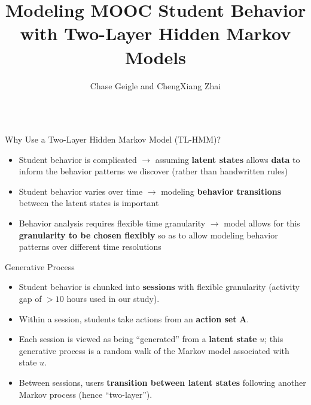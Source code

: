 \documentclass[final,t]{beamer}
\title{Modeling MOOC Student Behavior with Two-Layer Hidden Markov Models}
\author{Chase Geigle and ChengXiang Zhai}
\institute[University of Illinois]{University of Illinois at
Urbana-Champaign, Department of Computer Science}
\date{}
\newcommand{\msp}[0]{\\[0.5\baselineskip]}
\newcommand{\vsp}[0]{\vspace{0.21in}}
\begin{document}
\begin{frame}[fragile]
  \begin{columns}[t]
    \begin{column}{0.6\textwidth}
      \begin{block}{Why Use a Two-Layer Hidden Markov Model (TL-HMM)?}
        \begin{itemize}
          \item Student behavior is complicated $\rightarrow$ assuming
            \textbf{latent states} allows \textbf{data} to inform the
            behavior patterns we discover (rather than handwritten rules)
            \msp{}

          \item Student behavior varies over time $\rightarrow$ modeling
            \textbf{behavior transitions} between the latent states is
            important
            \msp{}

          \item Behavior analysis requires flexible time granularity
            $\rightarrow$ model allows for this \textbf{granularity to be
            chosen flexibly} so as to allow modeling behavior patterns over
            different time resolutions
        \end{itemize}
      \end{block}
      \vsp{}
      \begin{block}{Generative Process}
        \begin{itemize}
          \item Student behavior is chunked into \textbf{sessions} with
            flexible granularity (activity gap of $>10$ hours used in our
            study). \msp{}
          \item Within a session, students take actions from an
            \textbf{action set} $\mathbf{A}$.
            \msp{}
          \item Each session is viewed as being ``generated'' from a
            \textbf{latent state} $u$; this generative process is a random
            walk of the Markov model associated with state $u$.
            \msp{}
          \item Between sessions, users \textbf{transition between latent
            states} following another Markov process (hence ``two-layer'').
        \end{itemize}


\end{block}
\end{column}
\end{columns}
\end{frame}
\end{document}
